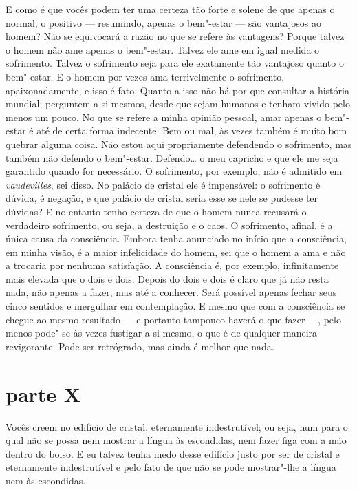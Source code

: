 E como é que vocês podem ter uma certeza tão forte e solene de que
apenas o normal, o positivo --- resumindo, apenas o bem"-estar --- são
vantajosos ao homem? Não se equivocará a razão no que se refere às
vantagens? Porque talvez o homem não ame apenas o bem"-estar. Talvez ele
ame em igual medida o sofrimento. Talvez o sofrimento seja para ele
exatamente tão vantajoso quanto o bem"-estar. E o homem por vezes ama
terrivelmente o sofrimento, apaixonadamente, e isso é fato. Quanto a
isso não há por que consultar a história mundial; perguntem a si
mesmos, desde que sejam humanos e tenham vivido pelo menos um pouco. No
que se refere a minha opinião pessoal, amar apenas o bem"-estar é até de
certa forma indecente. Bem ou mal, às vezes também é muito bom quebrar
alguma coisa. Não estou aqui propriamente defendendo o sofrimento, mas
também não defendo o bem"-estar. Defendo\ldots{} o meu capricho e que ele me
seja garantido quando for necessário. O sofrimento, por exemplo, não é
admitido em \textit{vaudevilles}, sei disso. No palácio de cristal ele
é impensável: o sofrimento é dúvida, é negação, e que palácio de
cristal seria esse se nele se pudesse ter dúvidas? E no entanto tenho
certeza de que o homem nunca recusará o verdadeiro sofrimento, ou seja,
a destruição e o caos. O sofrimento, afinal, é a única causa da
consciência. Embora tenha anunciado no início que a consciência, em
minha visão, é a maior infelicidade do homem, sei que o homem a ama e
não a trocaria por nenhuma satisfação. A consciência é, por exemplo,
infinitamente mais elevada que o dois e dois. Depois do dois e dois é
claro que já não resta nada, não apenas a fazer, mas até a conhecer.
Será possível apenas fechar seus cinco sentidos e mergulhar em
contemplação. E mesmo que com a consciência se chegue ao mesmo
resultado --- e portanto tampouco haverá o que fazer ---, pelo menos
pode"-se às vezes fustigar a si mesmo, o que é de qualquer maneira
revigorante. Pode ser retrógrado, mas ainda é melhor que nada.


\section{parte X}

Vocês creem no edifício de cristal, eternamente indestrutível; ou seja,
num para o qual não se possa nem mostrar a língua às escondidas, nem
fazer figa com a mão dentro do bolso. E eu talvez tenha medo desse
edifício justo por ser de cristal e eternamente indestrutível e pelo
fato de que não se pode mostrar"-lhe a língua nem às escondidas.

